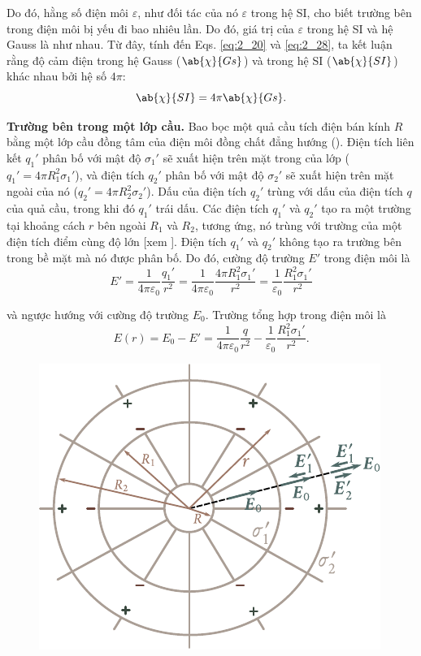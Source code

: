 \noindent
Do đó, hằng số điện môi $\varepsilon$, như đối tác của nó $\varepsilon$ trong hệ SI, cho biết trường bên trong điện môi bị yếu đi bao nhiêu lần. Do đó, giá trị của $\varepsilon$ trong hệ SI và hệ Gauss là như nhau. Từ đây, tính đến Eqs. \eqref{eq:2_20} và \eqref{eq:2_28}, ta kết luận rằng độ cảm điện trong hệ Gauss ($\ab{\chi}{Gs}$) và trong hệ SI ($\ab{\chi}{SI}$) khác nhau bởi hệ số $4\pi$:
\begin{equation}\label{eq:2_38}
    \ab{\chi}{SI} = 4\pi\ab{\chi}{Gs}.
\end{equation}

\textbf{Trường bên trong một lớp cầu.} Bao bọc một quả cầu tích điện bán kính $R$ bằng một lớp cầu đồng tâm của điện môi đồng chất đẳng hướng (). Điện tích liên kết $q_1'$ phân bố với mật độ $\sigma_1'$ sẽ xuất hiện trên mặt trong của lớp ($q_1'=4\pi R_1^2\sigma_1'$), và điện tích $q_2'$ phân bố với mật độ $\sigma_2'$ sẽ xuất hiện trên mặt ngoài của nó ($q_2'=4\pi R_2^2\sigma_2'$). Dấu của điện tích $q_2'$ trùng với dấu của điện tích $q$ của quả cầu, trong khi đó $q_1'$ trái dấu.
Các điện tích $q_1'$ và $q_2'$ tạo ra một trường tại khoảng cách $r$ bên ngoài $R_1$ và $R_2$, tương ứng, nó trùng với trường của một điện tích điểm cùng độ lớn [xem ]. Điện tích $q_1'$ và $q_2'$ không tạo ra trường bên trong bề mặt mà nó được phân bố. Do đó, cường độ trường $E'$ trong điện môi là
\begin{equation*}
    E' = \frac{1}{4\pi\varepsilon_0}\frac{q_1'}{r^2} = \frac{1}{4\pi\varepsilon_0} \frac{4\pi R_1^2\sigma_1'}{r^2} = \frac{1}{\varepsilon_0} \frac{R_1^2 \sigma_1'}{r^2}
\end{equation*}

\noindent
và ngược hướng với cường độ trường $E_0$. Trường tổng hợp trong điện môi là
\begin{equation}\label{eq:2_39}
    E(r) = E_0 - E' = \frac{1}{4\pi\varepsilon_0} \frac{q}{r^2} - \frac{1}{\varepsilon_0} \frac{R_1^2 \sigma_1'}{r^2}.
\end{equation}

\begin{figure}[!htb]
	\begin{center}
		\includegraphics[scale=1.0]{figures/ch_02/fig_2_6.pdf}
		\caption[]{}
		\label{fig:2_6}
	\end{center}
	\vspace{-0.8cm}
\end{figure}

